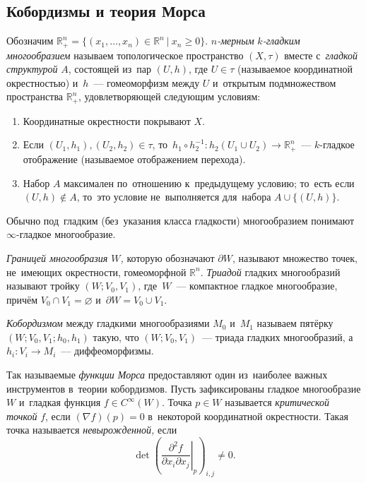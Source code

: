 \documentclass[a4paper,oneside]{article}
\begin{document}
\subsection{Кобордизмы и теория Морса}
Обозначим $\mathbb{R}^n_+ = \{ (x_1, \ldots, x_n) \in \mathbb{R}^n\ |\ x_n \geq 0 \}$.
\textit{$n$-мерным} \textit{$k$-гладким} \textit{многообразием} называем топологическое пространство $(X, \tau)$
вместе с~\textit{гладкой структурой} $A$, состоящей из~пар $(U, h)$, где $U \in \tau$
(называемое координатной окрестностью) и~$h$~— гомеоморфизм между $U$ и~открытым
подмножеством пространства $\mathbb{R}^n_+$, удовлетворяющей следующим условиям:
\begin{enumerate}
  \item Координатные окрестности покрывают $X$.
  \item Если $(U_1, h_1), (U_2, h_2) \in \tau$, то~$h_1 \circ h_2^{-1} : h_2(U_1 \cup U_2) \rightarrow \mathbb{R}^n_+$~— $k$-гладкое отображение
        (называемое отображением перехода).
  \item Набор $A$ максимален по~отношению к~предыдущему условию; то~есть если $(U, h) \notin A$,
  то~это условие не~выполняется для~набора $A \cup \{(U, h)\}$.
\end{enumerate}

Обычно под~гладким (без~указания класса гладкости) многообразием понимают $\infty$-гладкое многообразие.

\textit{Границей многообразия $W$,} которую обозначают $\partial W$, называют множество точек,
не~имеющих окрестности, гомеоморфной $\mathbb{R}^n$. \textit{Триадой} гладких многообразий \cite{Mil65} называют
тройку $(W; V_0, V_1)$, где~$W$~— компактное гладкое многообразие, причём $V_0 \cap V_1 = \varnothing$
и~$\partial W = V_0 \cup V_1$.

\textit{Кобордизмом} между гладкими многообразиями $M_0$ и~$M_1$ называем пятёрку
$(W;\allowbreak V_0,\allowbreak V_1;\allowbreak h_0,\allowbreak h_1)$ такую,
что $(W; V_0, V_1)$~— триада гладких многообразий, а~$h_i : V_i \rightarrow M_i$~— диффеоморфизмы.

Так называемые \textit{функции Морса} предоставляют один из~наиболее важных инструментов в~теории
кобордизмов. Пусть зафиксированы гладкое многообразие $W$ и~гладкая функция $f \in C^{\infty}(W)$.
Точка $p \in W$ называется \textit{критической точкой} $f$, если $(\nabla f)(p) = 0$ в~некоторой
координатной окрестности. Такая точка называется \textit{невырожденной,} если
\[
  \det\left(\left.\frac{\partial^2 f}{\partial x_i \partial x_j}\right|_{p}\right)_{i,j} \neq 0.
\]
\end{document}
